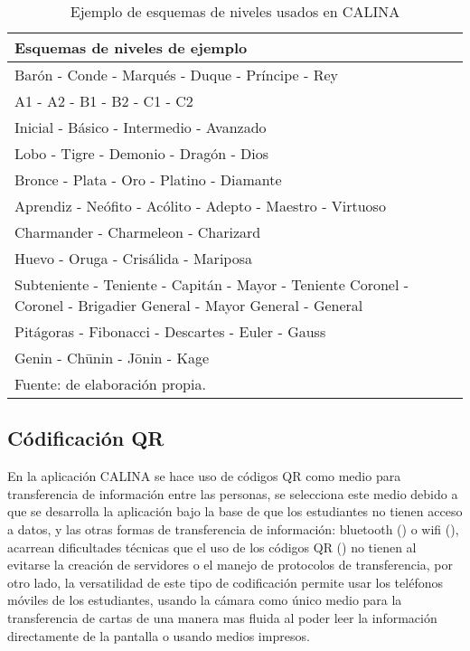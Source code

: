 \begin{table}[ht]
\caption{Ejemplo de esquemas de niveles usados en CALINA}
\label{tab:esquemasniveles}
\begin{center}
\small
\begin{tabular}{ p{150mm}}
\toprule
\textbf{Esquemas de niveles de ejemplo}\\ 
\midrule
Barón - Conde - Marqués - Duque - Príncipe - Rey\\
\midrule
A1 - A2 - B1 - B2 - C1 - C2\\
\midrule
Inicial - Básico - Intermedio - Avanzado\\
\midrule
Lobo - Tigre - Demonio - Dragón - Dios\\
\midrule
Bronce - Plata - Oro - Platino - Diamante\\
\midrule
Aprendiz - Neófito - Acólito - Adepto - Maestro - Virtuoso\\
\midrule
Charmander - Charmeleon - Charizard\\
\midrule
Huevo - Oruga - Crisálida - Mariposa\\
\midrule
Subteniente - Teniente - Capitán - Mayor - Teniente Coronel - Coronel - Brigadier General - Mayor General - General\\
\midrule
Pitágoras - Fibonacci - Descartes - Euler - Gauss\\
\midrule
Genin - Chūnin - Jōnin - Kage\\
\bottomrule
\multicolumn{1}{l}{\footnotesize Fuente: de elaboración propia.}\\
\end{tabular}
\end{center}
\end{table}


\subsection{Códificación QR}

En la aplicación CALINA se hace uso de códigos QR como medio para transferencia de información entre las 
personas, se selecciona este medio debido a que se desarrolla la aplicación bajo la base de que los 
estudiantes no tienen acceso a datos, y las otras formas de transferencia de información: bluetooth 
(\faBluetoothB) o wifi (\faWifi), acarrean dificultades técnicas que el uso de los códigos QR (\faQrcode) no 
tienen al evitarse la creación de servidores o el manejo de protocolos de transferencia, por otro lado, la 
versatilidad de este tipo de codificación permite usar los teléfonos móviles de los estudiantes, usando la 
cámara como único medio para la transferencia de cartas de una manera mas fluida al poder leer la información 
directamente de la pantalla o usando medios impresos.


